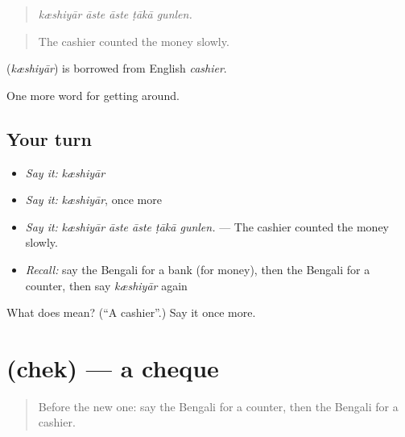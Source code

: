 \begin{quote}
    
\end{quote}

\begin{quote}
\emph{kæshiyār āste āste ṭākā gunlen.}
\end{quote}

\begin{quote}
The cashier counted the money slowly.
\end{quote}

\begin{cousinweb}
\textbf{} (\emph{kæshiyār}) is borrowed from English \emph{cashier}.
\end{cousinweb}

\begin{grammarlens}[title={What you've built}]
One more word for getting around.
\end{grammarlens}

\subsection*{Your turn}
\begin{itemize}
\raggedright
  \item \emph{Say it:} \emph{kæshiyār}
  \item \emph{Say it:} \emph{kæshiyār}, once more
  \item \emph{Say it:} \emph{kæshiyār āste āste ṭākā gunlen.} — The cashier counted the money slowly.
  \item \emph{Recall:} say the Bengali for a bank (for money), then the Bengali for a counter, then say \emph{kæshiyār} again
\end{itemize}

\begin{tcolorbox}[breakable,colback=teal!4,colframe=teal!35!black,title={Before you move on}]
What does  mean? (\textquotedblleft{}A cashier\textquotedblright{}.) Say it once more.
\end{tcolorbox}
\section[\texorpdfstring{\bn{চেক} (chek)}{চেক (chek)}]{ (chek) — a cheque}

\label{lesson:BN-C414-chek}



\begin{quote}
Before the new one: say the Bengali for a counter, then the Bengali for a cashier.
\end{quote}

